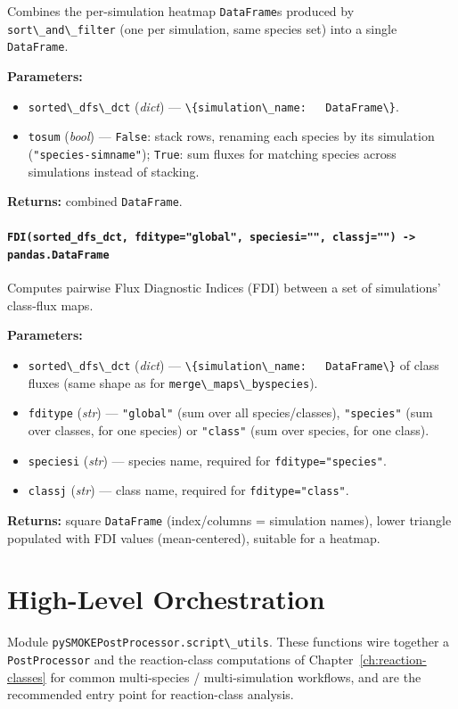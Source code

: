 \documentclass[11pt,a4paper]{report}
\newcommand{\pyfunc}[1]{\subsubsection{\texttt{#1}}}
\newcommand{\returns}{\vspace{2mm}\noindent\textbf{Returns:} }
\newenvironment{params}{\vspace{1mm}\noindent\textbf{Parameters:}\begin{itemize}[leftmargin=1.1cm,label={--},itemsep=1pt,topsep=2pt]}{\end{itemize}}
\newcommand{\pkg}[1]{\lstinline|#1|}
\begin{document}
Combines the per-simulation heatmap \pkg{DataFrame}s produced by
\pkg{sort\_and\_filter} (one per simulation, same species set) into a single
\pkg{DataFrame}.

\begin{params}
\item \pkg{sorted\_dfs\_dct} (\textit{dict}) --- \pkg{\{simulation\_name:
  DataFrame\}}.
\item \pkg{tosum} (\textit{bool}) --- \pkg{False}: stack rows, renaming each
  species by its simulation (\pkg{"species-simname"}); \pkg{True}: sum
  fluxes for matching species across simulations instead of stacking.
\end{params}
\returns combined \pkg{DataFrame}.

\pyfunc{FDI(sorted\_dfs\_dct, fditype="global", speciesi="", classj="") -> pandas.DataFrame}

Computes pairwise Flux Diagnostic Indices (FDI) between a set of
simulations' class-flux maps. %

\begin{params}
\item \pkg{sorted\_dfs\_dct} (\textit{dict}) --- \pkg{\{simulation\_name:
  DataFrame\}} of class fluxes (same shape as for
  \pkg{merge\_maps\_byspecies}).
\item \pkg{fditype} (\textit{str}) --- \pkg{"global"} (sum over all
  species/classes), \pkg{"species"} (sum over classes, for one species) or
  \pkg{"class"} (sum over species, for one class).
\item \pkg{speciesi} (\textit{str}) --- species name, required for
  \pkg{fditype="species"}.
\item \pkg{classj} (\textit{str}) --- class name, required for
  \pkg{fditype="class"}.
\end{params}
\returns square \pkg{DataFrame} (index/columns = simulation names), lower
triangle populated with FDI values (mean-centered), suitable for a heatmap.

\chapter{High-Level Orchestration}
\label{ch:orchestration}

Module \pkg{pySMOKEPostProcessor.script\_utils}. These functions wire
together a \pkg{PostProcessor} and the reaction-class computations of
Chapter~\ref{ch:reaction-classes} for common multi-species / multi-simulation
workflows, and are the recommended entry point for reaction-class analysis.
\end{document}

